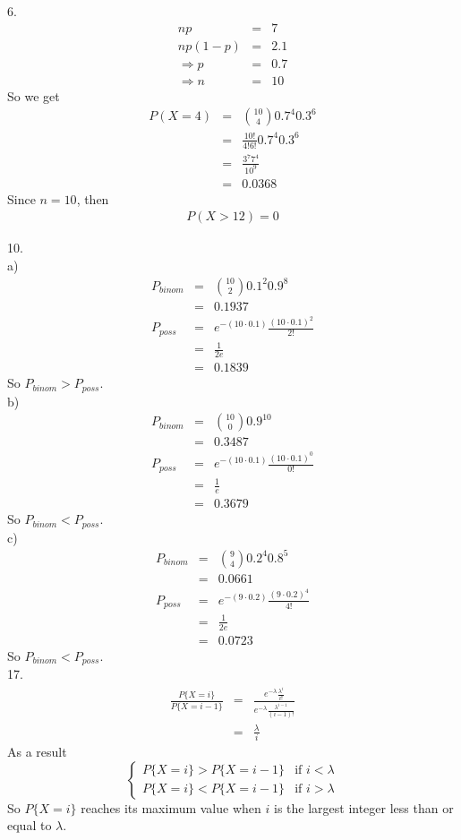 \documentclass[12pt]{article}
\begin{document}
6.
\begin{eqnarray*}
  np &=& 7 \\
  np(1-p) &=& 2.1 \\
  \Rightarrow p &=& 0.7 \\
  \Rightarrow n &=& 10
\end{eqnarray*}
So we get
\begin{eqnarray*}
  P(X = 4)
  &=& \binom {10}{4} 0.7^4 0.3^6 \\
  &=& \frac {10!}{4!6!} 0.7^4 0.3^6 \\
  &=& \frac {3^7 7^4}{10^9} \\
  &=& 0.0368
\end{eqnarray*}
Since $n = 10$, then
\begin{eqnarray*}
  P(X > 12) = 0
\end{eqnarray*}

10. \\
a)
\begin{eqnarray*}
  P_{binom}
  &=& \binom {10}{2} 0.1^2 0.9^8 \\
  &=& 0.1937 \\
  P_{poss}
  &=& e^{- (10 \cdot 0.1)} \frac {(10 \cdot 0.1)^2}{2!} \\
  &=& \frac {1}{2e} \\
  &=& 0.1839
\end{eqnarray*}
So $P_{binom} > P_{poss}$. \\
b)
\begin{eqnarray*}
  P_{binom}
  &=& \binom {10}{0} 0.9^{10} \\
  &=& 0.3487 \\
  P_{poss}
  &=& e^{- (10 \cdot 0.1)} \frac {(10 \cdot 0.1)^0}{0!} \\
  &=& \frac {1}{e} \\
  &=& 0.3679
\end{eqnarray*}
So $P_{binom} < P_{poss}$. \\
c)
\begin{eqnarray*}
  P_{binom}
  &=& \binom {9}{4} 0.2^4 0.8^5 \\
  &=& 0.0661 \\
  P_{poss}
  &=& e^{- (9 \cdot 0.2)} \frac {(9 \cdot 0.2)^4}{4!} \\
  &=& \frac {1}{2e} \\
  &=& 0.0723
\end{eqnarray*}
So $P_{binom} < P_{poss}$. \\

17.
\begin{eqnarray*}
  \frac {P \{ X = i \}}{P \{ X = i - 1 \}}
  &=& \frac {e^{- \lambda} \frac {\lambda^i}{i!}}
  {e^{- \lambda} \frac {\lambda^{i-1}}{(i-1)!}} \\
  &=& \frac {\lambda}{i}          
\end{eqnarray*}
As a result
\begin{equation*}
\begin{cases}
  P \{ X = i \} > P \{ X = i - 1 \} & \text {if } i < \lambda \\
  P \{ X = i \} < P \{ X = i - 1 \} & \text {if } i > \lambda
\end{cases}
\end{equation*}
So $P \{ X = i \}$ reaches its maximum value when $i$ is the largest integer less than or equal to $\lambda$.
\end{document}
